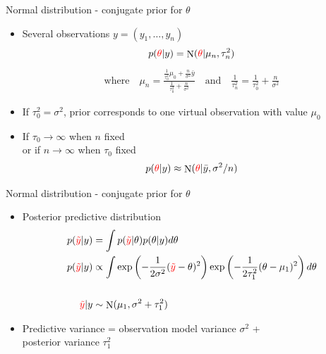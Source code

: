 \documentclass[english,t]{beamer}
\DeclareMathOperator{\N}{N}
\begin{document}
\begin{frame}{Normal distribution - conjugate prior for $\theta$}

  \begin{itemize}
  \item Several observations $y=(y_1,\ldots,y_n)$
    \begin{align*}
      p({\color{red}\theta}|y) = \N({\color{red}\theta}|\mu_n,\tau_n^2)
    \end{align*}
    \vskip -6mm
    \begin{align*}
      \text{where} \quad
      \mu_n=\frac{\frac{1}{\tau_0^2}\mu_0+\frac{n}{\sigma^2}\bar{y}}{\frac{1}{\tau_0^2}+\frac{n}{\sigma^2}} \quad
      \text{and} \quad \frac{1}{\tau_n^2} = \frac{1}{\tau_0^2}+\frac{n}{\sigma^2}
    \end{align*}
  \item If $\tau_0^2=\sigma^2$, prior corresponds to one virtual observation with value $\mu_0$
    \pause
  \item If $\tau_0\rightarrow\infty$ when $n$ fixed\\
    or if $n\rightarrow\infty$ when $\tau_0$ fixed
    \begin{equation*}
      p({\color{red}\theta}|y) \approx \N({\color{red}\theta}|\bar{y},\sigma^2/n)
    \end{equation*}
  \end{itemize}

\end{frame}

\begin{frame}{Normal distribution - conjugate prior for $\theta$}

  \begin{itemize}
  \item Posterior predictive distribution
    \begin{align*}
      p({\color{red}\tilde{y}}|y)&=\int p({\color{red}\tilde{y}}|\theta)p(\theta|y) d\theta \\
      p({\color{red}\tilde{y}}|y)& \propto\int
                                   \exp\left(-\frac{1}{2\sigma^2}({\color{red}\tilde{y}}-\theta)^2\right)\exp\left(-\frac{1}{2\tau_1^2}(\theta-\mu_1)^2\right) d\theta \\
      ~&~\\ 
      {\color{red}\tilde{y}}|y &\sim \N(\mu_1,\sigma^2+\tau_1^2)
    \end{align*}
  \item Predictive variance = observation model variance $\sigma^2$ + \\
    posterior variance $\tau_1^2$

  \end{itemize}

\end{frame}
\end{document}
